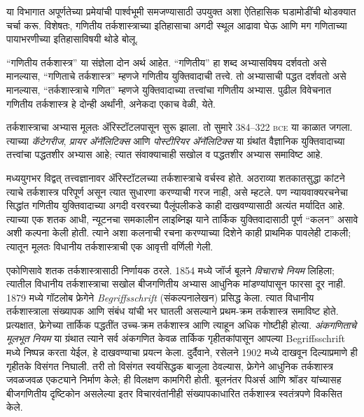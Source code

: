 \documentclass[../../../include/open-logic-section]{subfiles}
\begin{document}


या विभागात अपूर्णतेच्या प्रमेयांची पार्श्वभूमी समजण्यासाठी उपयुक्त अशा
ऐतिहासिक घडामोडींची थोडक्यात चर्चा करू. विशेषतः, गणितीय तर्कशास्त्राच्या
इतिहासाचा अगदी स्थूल आढावा घेऊ आणि मग गणिताच्या पायाभरणीच्या इतिहासाविषयी
थोडे बोलू.

\begin{digress}
  ``गणितीय तर्कशास्त्र'' या संज्ञेला दोन अर्थ आहेत. ``गणितीय'' हा शब्द
  अभ्यासविषय दर्शवतो असे मानल्यास, ``गणिताचे तर्कशास्त्र'' म्हणजे गणितीय
  युक्तिवादाची तत्त्वे. तो अभ्यासाची पद्धत दर्शवतो असे मानल्यास,
  ``तर्कशास्त्राचे गणित'' म्हणजे युक्तिवादाच्या तत्त्वांचा गणितीय अभ्यास.
  पुढील विवेचनात गणितीय तर्कशास्त्र हे दोन्ही अर्थांनी, अनेकदा एकाच वेळी,
  येते.
\end{digress}

तर्कशास्त्राचा अभ्यास मूलतः ॲरिस्टॉटलपासून सुरू झाला. तो सुमारे
384--322 \textsc{bce} या काळात जगला. त्याच्या \emph{कॅटेगरीज}, \emph{प्रायर
  ॲनॅलिटिक्स} आणि \emph{पोस्टीरियर ॲनॅलिटिक्स} या ग्रंथांत वैज्ञानिक युक्तिवादाच्या
तत्त्वांचा पद्धतशीर अभ्यास आहे; त्यात संवाक्याचाही सखोल व
पद्धतशीर अभ्यास समाविष्ट आहे.

मध्ययुगभर विद्वत् तत्त्वज्ञानावर ॲरिस्टॉटलच्या तर्कशास्त्राचे वर्चस्व होते.
अठराव्या शतकातसुद्धा कांटने त्याचे तर्कशास्त्र परिपूर्ण असून त्यात सुधारणा
करण्याची गरज नाही, असे म्हटले. पण न्यायवाक्यरचनेचा सिद्धांत गणितीय
युक्तिवादाच्या अगदी वरवरच्या पैलूंपलीकडे काही दाखवण्यासाठी अत्यंत मर्यादित
आहे. त्याच्या एक शतक आधी, न्यूटनचा समकालीन लाइब्निझ याने तार्किक
युक्तिवादासाठी पूर्ण ``कलन'' असावे अशी कल्पना केली होती. त्याने अशा कलनाची
रचना करण्याच्या दिशेने काही प्राथमिक पावलेही टाकली; त्यातून मूलतः विधानीय
तर्कशास्त्राची एक आवृत्ती वर्णिली गेली.

एकोणिसावे शतक तर्कशास्त्रासाठी निर्णायक ठरले. 1854 मध्ये जॉर्ज बूलने
\emph{विचाराचे नियम} लिहिला; त्यातील विधानीय तर्कशास्त्राचा सखोल बीजगणितीय
अभ्यास आधुनिक मांडण्यांपासून फारसा दूर नाही. 1879 मध्ये गॉटलोब फ्रेगेने
\emph{Begriffsschrift} (संकल्पनालेखन) प्रसिद्ध केला. त्यात विधानीय
तर्कशास्त्राला संख्यापक आणि संबंध यांची भर घातली असल्याने प्रथम-क्रम
तर्कशास्त्र समाविष्ट होते. प्रत्यक्षात, फ्रेगेच्या तार्किक पद्धतींत
उच्च-क्रम तर्कशास्त्र आणि त्याहून अधिक गोष्टीही होत्या. \emph{अंकगणिताचे
  मूलभूत नियम} या ग्रंथात त्याने सर्व अंकगणित केवळ तार्किक गृहीतकांपासून
आपल्या Begriffsschrift मध्ये निष्पन्न करता येईल, हे दाखवण्याचा प्रयत्न
केला. दुर्दैवाने, रसेलने 1902 मध्ये दाखवून दिल्याप्रमाणे ही गृहीतके
विसंगत निघाली. तरी तो विसंगत स्वयंसिद्धक बाजूला ठेवल्यास, फ्रेगेने आधुनिक
तर्कशास्त्र जवळजवळ एकट्याने निर्माण केले; ही विलक्षण कामगिरी होती.
बूलनंतर पिअर्स आणि श्रॉडर यांच्यासह बीजगणितीय दृष्टिकोन असलेल्या इतर
विचारवंतांनीही संख्यापकाधारित तर्कशास्त्र स्वतंत्रपणे विकसित केले.
\end{document}
